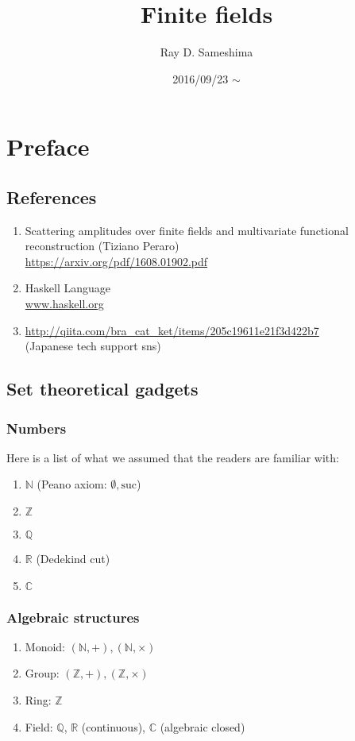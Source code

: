 \documentclass[11pt]{book}
\begin{document}
\newcommand{\Slash}[1]{{\ooalign{\hfil/\crcr$#1$}}}

\title{Finite fields}
\author{Ray D. Sameshima}
\date{2016/09/23 $\sim$}
\maketitle

\tableofcontents

\setcounter{chapter}{-1}
\chapter{Preface}
\section{References}
\begin{enumerate}
\item Scattering amplitudes over finite fields and multivariate functional reconstruction (Tiziano Peraro)\\
\url{https://arxiv.org/pdf/1608.01902.pdf}

\item Haskell Language \\
\url{www.haskell.org}

\item \url{http://qiita.com/bra_cat_ket/items/205c19611e21f3d422b7}\\
(Japanese tech support sns)
\end{enumerate}

\section{Set theoretical gadgets}
\subsection{Numbers}
Here is a list of what we assumed that the readers are familiar with:
\begin{enumerate}
\item $\mathbb{N}$ (Peano axiom: $\emptyset, \text{suc}$)
\item $\mathbb{Z}$
\item $\mathbb{Q}$
\item $\mathbb{R}$ (Dedekind cut)
\item $\mathbb{C}$ 
\end{enumerate}

\subsection{Algebraic structures}
\begin{enumerate}
\item Monoid: $(\mathbb{N},+), (\mathbb{N},\times)$
\item Group: $(\mathbb{Z},+), (\mathbb{Z},\times)$
\item Ring: $\mathbb{Z}$
\item Field: $\mathbb{Q}$, $\mathbb{R}$ (continuous), $\mathbb{C}$ (algebraic closed)
\end{enumerate}
\end{document}
